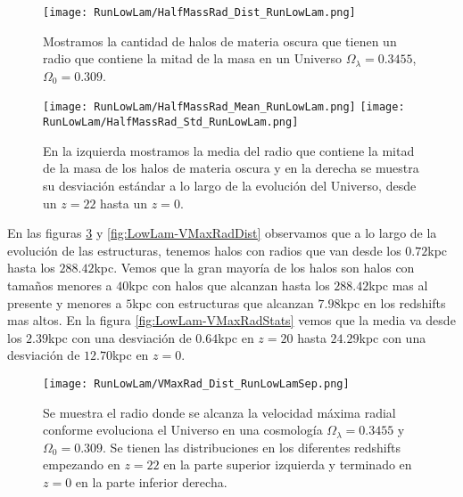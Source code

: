 \begin{figure}[H]
    \centering
    \texttt{[image: RunLowLam/HalfMassRad\_Dist\_RunLowLam.png]}
    \caption[Distribución del radio que contiene la mitad de la masa]{\footnotesize Mostramos la cantidad de halos de materia oscura que tienen un radio que contiene la mitad de la masa en un Universo $\Omega_\lambda = 0.3455$, $\Omega_0 = 0.309$.}
    \label{fig:LowLam-HalfMassRadDist}
\end{figure}

\begin{figure}[H]
    \centering
    \texttt{[image: RunLowLam/HalfMassRad\_Mean\_RunLowLam.png]}
    \texttt{[image: RunLowLam/HalfMassRad\_Std\_RunLowLam.png]}
    \caption[Media y desviación estándar del radio de la mitad de la masa]{\footnotesize En la izquierda mostramos la media del radio que contiene la mitad de la masa de los halos de materia oscura y en la derecha se muestra su desviación estándar a lo largo de la evolución del Universo, desde un $z=22$ hasta un $z=0$.}
    \label{fig:LowLam-HalfMassRadStats}
\end{figure}

En las figuras \ref{fig:LowLam-VMaxRadDistSep} y \ref{fig:LowLam-VMaxRadDist} observamos que a lo largo de la evolución de las estructuras, tenemos halos con radios que van desde los $0.72$kpc hasta los $288.42$kpc. Vemos que la gran mayoría de los halos son halos con tamaños menores a $40$kpc con halos que alcanzan hasta los $288.42$kpc mas al presente y menores a $5$kpc con estructuras que alcanzan $7.98$kpc en los redshifts mas altos. En la figura \ref{fig:LowLam-VMaxRadStats} vemos que la media va desde los $2.39$kpc con una desviación de $0.64$kpc en $z=20$ hasta $24.29$kpc con una desviación de $12.70$kpc en $z=0$.

\begin{figure}[H]
    \centering
    \texttt{[image: RunLowLam/VMaxRad\_Dist\_RunLowLamSep.png]}
    \caption[Radio donde se alcanza la velocidad máxima radial]{\footnotesize Se muestra el radio donde se alcanza la velocidad máxima radial conforme evoluciona el Universo en una cosmología $\Omega_\lambda = 0.3455$ y $\Omega_0 = 0.309$. Se tienen las distribuciones en los diferentes redshifts empezando en $z=22$ en la parte superior izquierda y terminado en $z=0$ en la parte inferior derecha.}
    \label{fig:LowLam-VMaxRadDistSep}
\end{figure}

